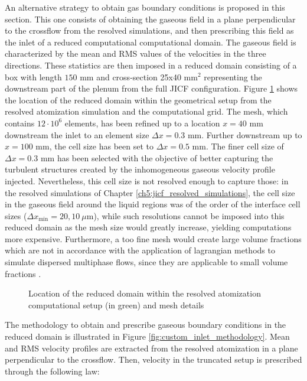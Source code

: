 An alternative strategy to obtain gas boundary conditions is proposed in this section. This one consists of obtaining the gaseous field in a plane perpendicular
to the crossflow from the resolved simulations, and then prescribing this field as the inlet of a reduced computational computational domain. The gaseous field is characterized by the mean and RMS values of the velocities in the three directions. These statistics are then imposed in a reduced domain consisting of a box with length $150$ mm and cross-section 25x40 mm$^2$ representing the downstream part of the plenum from the full JICF configuration. Figure \ref{fig:mesh_reduced_inlet} shows the location of the reduced domain within the geometrical setup from the resolved atomization simulation and the computational grid. The mesh, which contains $12 \cdot 10^6$ elements, has been refined up to a location $x = 40$ mm downstream the inlet to an element size $\Delta x = 0.3$ mm.  Further downstream up to $x = 100$ mm, the cell size has been set to $\Delta x = 0.5$ mm. The finer cell size of $\Delta x = 0.3$ mm has been selected  with the objective of better capturing the turbulent structures created by the inhomogeneous gaseous velocity profile injected. Nevertheless, this cell size is not resolved enough to capture those: in the resolved simulations of Chapter \ref{ch5:jicf_resolved_simulations}, the cell size in the gaseous field around the liquid regions was of the order of the interface cell sizes ($\Delta x_\mathrm{min} = 20, 10~\mu$m), while such resolutions cannot be imposed into this reduced domain as the mesh size would greatly increase, yielding computations more expensive. Furthermore, a too fine mesh would create large volume fractions which are not in accordance with the application of lagrangian methods to simulate dispersed multiphase flows, since they are applicable to small volume fractions .


\begin{figure}[h!]	
	\centering	
	\caption{Location of the reduced domain within the resolved atomization computational setup (in green) and mesh details}
	\label{fig:mesh_reduced_inlet}
\end{figure}






The methodology to obtain and prescribe gaseous boundary conditions in the reduced domain is illustrated in Figure \ref{fig:custom_inlet_methodology}. Mean and RMS velocity profiles are extracted from the resolved atomization in a plane perpendicular to the crossflow. Then, velocity in the truncated setup is prescribed through the following law:

